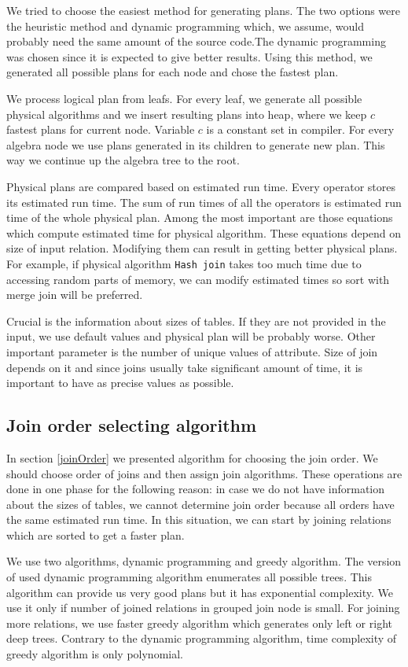 We tried to choose the easiest method for generating plans. The two options were the heuristic method and dynamic programming which, we assume, would probably need the same amount of the source code.The dynamic programming was chosen since it is expected to give better results. Using this method, we generated all possible plans for each node and chose the fastest plan.

We process logical plan from leafs. For every leaf, we generate all possible physical algorithms and we insert resulting plans into heap, where we keep $c$ fastest plans for current node. Variable $c$ is a constant set in compiler.
For every algebra node we use plans generated in its children to generate new plan. This way we continue up the algebra tree to the root.

Physical plans are compared based on estimated run time. Every operator stores its estimated run time. The sum of run times of all the operators is estimated run time of the whole physical plan.
Among the most important are those equations which compute estimated time for physical algorithm. These equations depend on size of input relation. Modifying them can result in getting better physical plans. For example, if physical algorithm \texttt{Hash join} takes too much time due to accessing random parts of memory, we can modify estimated times so sort with merge join will be preferred.

Crucial is the information about sizes of tables. If they are not provided in the input, we use default values and physical plan will be probably worse. Other important parameter is the number of unique values of attribute. Size of join depends on it and since joins usually take significant amount of time, it is important to have as precise values as possible. 

\subsection{Join order selecting algorithm}


In section \ref{joinOrder} we presented algorithm for choosing the join order. We should choose order of joins and then assign join algorithms. These operations are done in one phase for the following reason: in case we do not have information about the sizes of tables, we cannot determine join order because all orders have the same estimated run time. In this situation, we can start by joining relations which are sorted to get a faster plan.

We use two algorithms, dynamic programming and greedy algorithm. The version of used dynamic programming algorithm enumerates all possible trees. This algorithm can provide us very good plans but it has exponential complexity. We use it only if number of joined relations in grouped join node is small. For joining more relations, we use faster greedy algorithm which generates only left or right deep trees. Contrary to the dynamic programming algorithm, time complexity of greedy algorithm is only polynomial.

